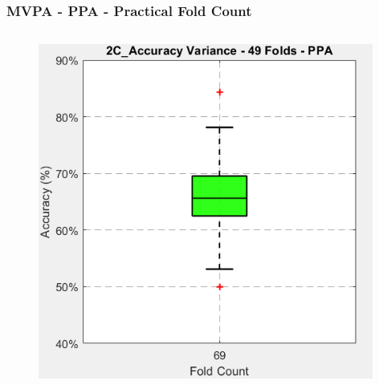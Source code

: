 \begin{frame}
\frametitle{MVPA - PPA - Practical Fold Count}
	\begin{columns}
		\begin{column}{0.49\textwidth}		
			\begin{itemize}
			\end{itemize}
			\begin{figure}
				\centering
				\includegraphics[width=0.98\textwidth]{assets/box_2C_49_ppa.png}
			\end{figure}
		\end{column}


\end{columns}
\end{frame}
